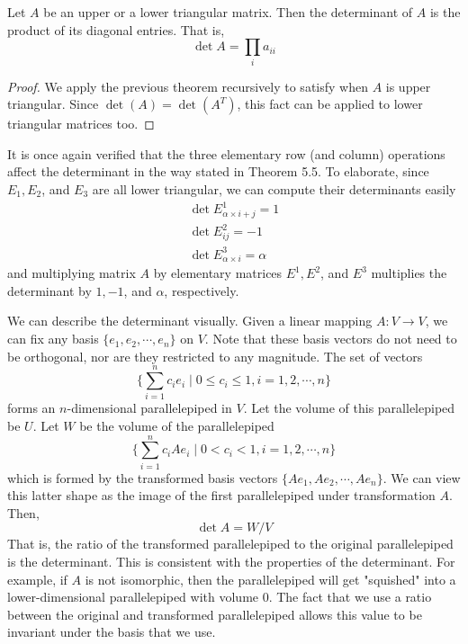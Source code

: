   \begin{corollary}
    Let $A$ be an upper or a lower triangular matrix. Then the determinant of $A$ is the product of its diagonal entries. That is,  
    \begin{equation}
      \det{A} = \prod_{i} a_{i i}
    \end{equation}
  \end{corollary}
  \begin{proof}
    We apply the previous theorem recursively to satisfy when $A$ is upper triangular. Since $\det{(A)} = \det{(A^T)}$, this fact can be applied to lower triangular matrices too. 
  \end{proof}

  It is once again verified that the three elementary row (and column) operations affect the determinant in the way stated in Theorem 5.5. To elaborate, since $E_1, E_2$, and $E_3$ are all lower triangular, we can compute their determinants easily
  \begin{align*}
    \det{E^1_{\alpha \times i + j}} = 1 \\
    \det{E^2_{i j}} = -1 \\
    \det{E^3_{\alpha \times i}} = \alpha
  \end{align*}
  and multiplying matrix $A$ by elementary matrices $E^1, E^2$, and $E^3$ multiplies the determinant by $1, -1$, and $\alpha$, respectively. 

  We can describe the determinant visually. Given a linear mapping $A: V \longrightarrow V$, we can fix any basis $\{e_1, e_2, \cdots, e_n\}$ on $V$. Note that these basis vectors do not need to be orthogonal, nor are they restricted to any magnitude. The set of vectors 
  \begin{equation}
    \Big\{ \sum_{i=1}^n c_i e_i \mid 0 \leq c_i \leq 1, i = 1, 2, \cdots, n\Big\}
  \end{equation}
  forms an $n$-dimensional parallelepiped in $V$. Let the volume of this parallelepiped be $U$. Let $W$ be the volume of the parallelepiped 
  \begin{equation}
    \Big\{ \sum_{i=1}^n c_i A e_i \mid 0<c_i<1, i = 1, 2, \cdots, n\Big\}
  \end{equation}
  which is formed by the transformed basis vectors $\{Ae_1, Ae_2, \cdots, Ae_n\}$. We can view this latter shape as the image of the first parallelepiped under transformation $A$. Then, 
  \begin{equation}
    \det{A} = W / V 
  \end{equation}
  That is, the ratio of the transformed parallelepiped to the original parallelepiped is the determinant. This is consistent with the properties of the determinant. For example, if $A$ is not isomorphic, then the parallelepiped will get "squished" into a lower-dimensional parallelepiped with volume $0$. The fact that we use a ratio between the original and transformed parallelepiped allows this value to be invariant under the basis that we use. 

